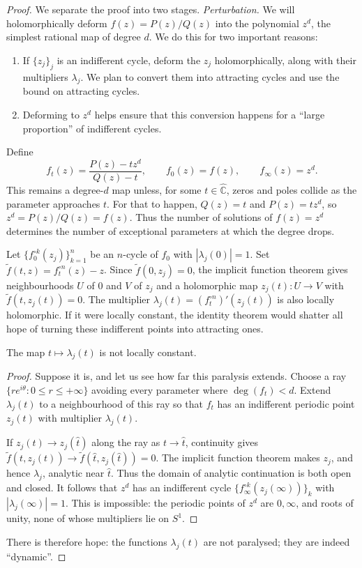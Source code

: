 \documentclass[11pt,a4paper]{article}
\begin{document}
\begin{proof}
We separate the proof into two stages.
\emph{Perturbation.} We will holomorphically deform $f(z)=P(z)/Q(z)$ into the polynomial $z^d$, the simplest rational map of degree $d$.
We do this for two important reasons:
\begin{enumerate}
\setcounter{enumi}{0}\item If $\{z_j\}_j$ is an indifferent cycle, deform the $z_j$ holomorphically, along with their multipliers $\lambda_j$. We plan to convert them into attracting cycles and use the bound on attracting cycles.
\setcounter{enumi}{1}\item Deforming to $z^d$ helps ensure that this conversion happens for a ``large proportion'' of indifferent cycles.
\end{enumerate}
Define
\[
f_t(z)=\frac{P(z)-tz^d}{Q(z)-t},\qquad f_0(z)=f(z),\qquad f_\infty(z)=z^d.
\]
This remains a degree-$d$ map unless, for some $t\in\widehat{\mathbb C}$, zeros and poles collide as the parameter approaches $t$. For that to happen, $Q(z)=t$ and $P(z)=tz^d$, so $z^d=P(z)/Q(z)=f(z)$. Thus the number of solutions of $f(z)=z^d$ determines the number of exceptional parameters at which the degree drops.

Let $\{f_0^{\circ k}(z_j)\}_{k=1}^n$ be an $n$-cycle of $f_0$ with $|\lambda_j(0)|=1$. Set $\widetilde f(t,z)=f_t^{\circ n}(z)-z$. Since $\widetilde f(0,z_j)=0$, the implicit function theorem gives neighbourhoods $U$ of $0$ and $V$ of $z_j$ and a holomorphic map $z_j(t)\colon U\to V$ with $\widetilde f(t,z_j(t))=0$.
The multiplier $\lambda_j(t)=(f_t^{\circ n})'(z_j(t))$ is also locally holomorphic. If it were locally constant, the identity theorem would shatter all hope of turning these indifferent points into attracting ones.
\setcounter{theorem}{20}\begin{lemma}\label{cd4:nonconstant}
The map $t\mapsto\lambda_j(t)$ is not locally constant.
\end{lemma}
\begin{proof}
Suppose it is, and let us see how far this paralysis extends. Choose a ray $\{re^{i\theta}:0\le r\le+\infty\}$ avoiding every parameter where $\deg(f_t)<d$. Extend $\lambda_j(t)$ to a neighbourhood of this ray so that $f_t$ has an indifferent periodic point $z_j(t)$ with multiplier $\lambda_j(t)$.

If $z_j(t)\to z_j(\widehat t)$ along the ray as $t\to\widehat t$, continuity gives
$\widetilde f(t,z_j(t))\to\widetilde f(\widehat t,z_j(\widehat t))=0$.
The implicit function theorem makes $z_j$, and hence $\lambda_j$, analytic near $\widehat t$. Thus the domain of analytic continuation is both open and closed. It follows that $z^d$ has an indifferent cycle $\{f_\infty^{\circ k}(z_j(\infty))\}_k$ with $|\lambda_j(\infty)|=1$. This is impossible: the periodic points of $z^d$ are $0,\infty$,
and roots of unity, none of whose multipliers lie on $S^1$.
\end{proof}
There is therefore hope: the functions $\lambda_j(t)$ are not paralysed; they are indeed ``dynamic''.


\end{proof}
\end{document}

